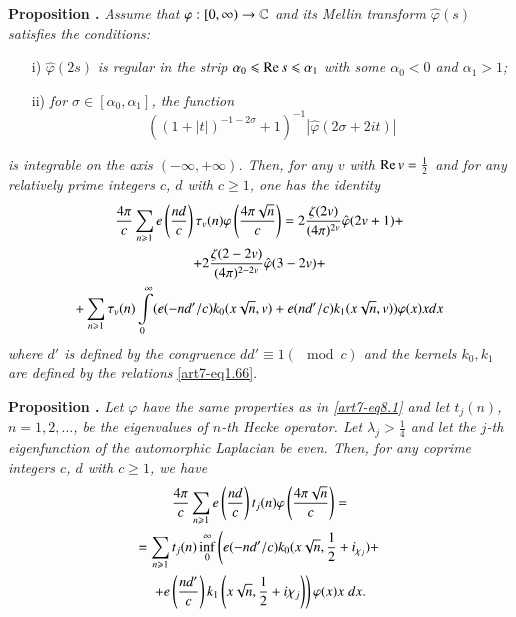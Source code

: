 \medskip
\noindent
{\bfseries Proposition .\label{art7-prop13}}
\textit{Assume that $\varphi:[0,\infty) \to \mathbb{C}$ and its Mellin transform $\hat{\varphi} (s)$ satisfies the conditions:}
\begin{itemize}
\item[i)] $\hat{\varphi}(2s)$ \textit{is regular in the strip $\alpha_0 \leqslant \operatorname{Re} s \leqslant \alpha_1$ with some $\alpha_0 <0$ and $\alpha_1 >1$;}

\item[ii)] \textit{for $\sigma \in [\alpha_0 , \alpha_1]$, the function}
$$
((1+|t|)^{-1-2\sigma} +1)^{-1} |\hat{\varphi} (2 \sigma + 2 it)|
$$
\end{itemize}
\textit{is integrable on the axis $(-\infty, + \infty)$. Then, for any $v$ with $\operatorname{Re} v = \frac{1}{2}$ and for any relatively prime integers $c$, $d$ with $c \geqslant 1$, one has the identity}
\setcounter{section}{8}
\setcounter{equation}{0}
\begin{gather}
\frac{4\pi}{c} \sum\limits_{n \geqslant 1} e \left(\frac{nd}{c} \right) \tau_v (n) \varphi \left(\frac{4\pi \sqrt{n}}{c} \right) = 2 \frac{\zeta (2v)}{(4 \pi)^{2v}} \hat{\varphi} (2v+1) + \\\label{art7-eq8.1}
+ 2 \frac{\zeta (2 - 2 v)}{(4\pi)^{2-2v}} \hat{\varphi} (3 - 2 v) + \notag\\
+ \sum\limits_{n \geqslant 1} \tau_v (n) \int\limits^\infty_0 (e (-nd'/c) k_0 (x \sqrt{n}, v) + e(nd'/ c) k_1 (x \sqrt{n}, v) ) \varphi  (x) x d x\notag
\end{gather}
\textit{where $d'$ is defined by the congruence $dd' \equiv 1 (\mod c)$ and the kernels $k_0, k_1$ are defined by the relations} \eqref{art7-eq1.66}.

\medskip
\noindent
{\bfseries Proposition .\label{art7-prop14}}
\textit{Let $\varphi$ have the same properties as in \eqref{art7-eq8.1} and let $t_j(n)$, $n = 1, 2, \ldots$, be the eigenvalues of $n$-th Hecke operator. Let $\lambda_j > \frac{1}{4}$ and let the $j$-th eigenfunction  of the automorphic Laplacian be even. Then, for any coprime integers $c$, $d$ with $c \geqslant 1$, we have}
\begin{gather}
\frac{4\pi}{c} \sum\limits_{n \geqslant 1} e \left(\frac{nd}{c} \right) t _j(n) \varphi \left(\frac{4\pi \sqrt{n}}{c} \right) = \label{art7-eq8.2}\\
= \sum\limits_{n \geqslant 1} t_j(n) \inf\limits^\infty_0 \left(e (-nd'/c) k_0 (x\sqrt{n},\frac{1}{2} + i_{\chi_j}) + \right. \notag \\
\left. + e \left(\frac{nd'}{c} \right) k_1 \left(x \sqrt{n}, \frac{1}{2} + i \chi_j \right) \right) \varphi (x)x \;d x.\notag
\end{gather}\pageoriginale 

